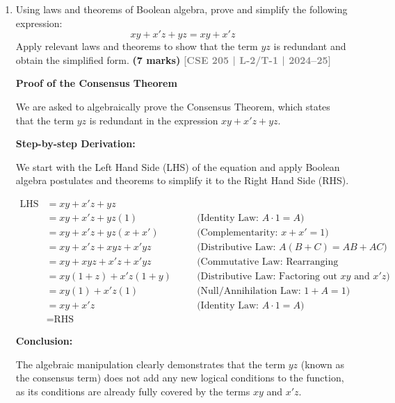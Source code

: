 \documentclass[12pt,a3paper]{article}
\newcommand{\yr}[1]{\hfill\textcolor{gray}{\small\textbf{[#1]}}}
\newcommand{\mk}[1]{\textcolor{orange!70!black}{\small\textbf{(#1 marks)}}}
\begin{document}
\begin{enumerate}

    

\item Using laws and theorems of Boolean algebra, prove and simplify the following expression:
\[ xy + x'z + yz = xy + x'z \]
Apply relevant laws and theorems to show that the term $yz$ is redundant and obtain the simplified form.
\mk{7} \yr{CSE 205 | L-2/T-1 | 2024--25}

\begin{tcolorbox}[enhanced,breakable,ansbox,colback=cA!4,colframe=cA,boxrule=0.8pt,arc=5pt,title={\textbf{Answer}},fonttitle=\bfseries\color{white},colbacktitle=cA]

\textbf{Proof of the Consensus Theorem}

We are asked to algebraically prove the Consensus Theorem, which states that the term $yz$ is redundant in the expression $xy + x'z + yz$. 

\textbf{Step-by-step Derivation:}

We start with the Left Hand Side (LHS) of the equation and apply Boolean algebra postulates and theorems to simplify it to the Right Hand Side (RHS).

\begin{align*}
    \text{LHS} &= xy + x'z + yz \\
    &= xy + x'z + yz(1) \quad &&\text{(Identity Law: } A \cdot 1 = A \text{)} \\
    &= xy + x'z + yz(x + x') \quad &&\text{(Complementarity: } x + x' = 1 \text{)} \\
    &= xy + x'z + xyz + x'yz \quad &&\text{(Distributive Law: } A(B+C) = AB + AC \text{)} \\
    &= xy + xyz + x'z + x'yz \quad &&\text{(Commutative Law: Rearranging terms)} \\
    &= xy(1 + z) + x'z(1 + y) \quad &&\text{(Distributive Law: Factoring out } xy \text{ and } x'z \text{)} \\
    &= xy(1) + x'z(1) \quad &&\text{(Null/Annihilation Law: } 1 + A = 1 \text{)} \\
    &= xy + x'z \quad &&\text{(Identity Law: } A \cdot 1 = A \text{)} \\
    &= \text{RHS}
\end{align*}

\textbf{Conclusion:}

The algebraic manipulation clearly demonstrates that the term $yz$ (known as the consensus term) does not add any new logical conditions to the function, as its conditions are already fully covered by the terms $xy$ and $x'z$. 


\end{tcolorbox}
\end{enumerate}
\end{document}
